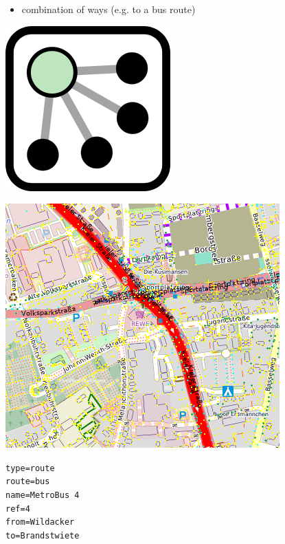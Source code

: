 \documentclass{beamer}
\begin{document}
	\begin{frame}
		\begin{itemize}
			\item combination of ways (e.g. to a bus route)
		\end{itemize}
		
		\vfill
		
		\begin{center}
			\begin{minipage}[b][0.6\textheight][c]{0.15\linewidth}
				\centering
				\includegraphics[width=0.5\linewidth,height=0.5\textheight,keepaspectratio]{images/240px-Mf_Relation.png}
			\end{minipage}
			\begin{minipage}[b][0.6\textheight][c]{0.5\linewidth}
				\centering
				\includegraphics[width=0.8\linewidth,height=0.8\textheight,keepaspectratio]{images/relations_example.png}
			\end{minipage}
			\begin{minipage}[b][0.6\textheight][c]{0.3\linewidth}
				\texttt{type=route}\\
				\texttt{route=bus}\\
				\texttt{name=MetroBus 4}\\
				\texttt{ref=4}\\
				\texttt{from=Wildacker}\\
				\texttt{to=Brandstwiete}
			\end{minipage}
		\end{center}
	\end{frame}
			
\end{document}
